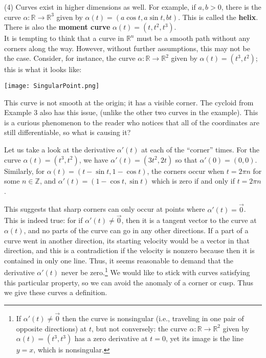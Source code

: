 \documentclass[leqno]{book}
\begin{document}
(4) Curves exist in higher dimensions as well.  For example, if $a,b>0$, there is the curve $\alpha:\mathbb R\to\mathbb R^3$ given by $\alpha(t)=(a\cos t,a\sin t,bt)$.  This is called the \textbf{helix}.  There is also the \textbf{moment curve} $\alpha(t)=(t,t^2,t^3)$.\\

\noindent It is tempting to think that a curve in $\mathbb R^n$ must be a smooth path without any corners along the way.  However, without further assumptions, this may not be the case.  Consider, for instance, the curve $\alpha:\mathbb R\to\mathbb R^2$ given by $\alpha(t)=(t^3,t^2)$; this is what it looks like:
\begin{center}
\texttt{[image: SingularPoint.png]}
\end{center}
This curve is not smooth at the origin; it has a visible corner.  The cycloid from Example 3 also has this issue, (unlike the other two curves in the example).  This is a curious phenomenon to the reader who notices that all of the coordinates are still differentiable, so what is causing it?

Let us take a look at the derivative $\alpha'(t)$ at each of the ``corner'' times.  For the curve $\alpha(t)=(t^3,t^2)$, we have $\alpha'(t)=(3t^2,2t)$ so that $\alpha'(0)=(0,0)$.  Similarly, for $\alpha(t)=(t-\sin t,1-\cos t)$, the corners occur when $t=2\pi n$ for some $n\in\mathbb Z$, and $\alpha'(t)=(1-\cos t,\sin t)$ which is zero if and only if $t=2\pi n$.

This suggests that sharp corners can only occur at points where $\alpha'(t)=\vec 0$.  This is indeed true: for if $\alpha'(t)\ne\vec 0$, then it is a tangent vector to the curve at $\alpha(t)$, and no parts of the curve can go in any other directions.  If a part of a curve went in another direction, its starting velocity would be a vector in that direction, and this is a contradiction if the velocity is nonzero because then it is contained in only one line.  Thus, it seems reasonable to demand that the derivative $\alpha'(t)$ never be zero.\footnote{If $\alpha'(t)\ne\vec 0$ then the curve is nonsingular (i.e., traveling in one pair of opposite directions) at $t$, but not conversely: the curve $\alpha:\mathbb R\to\mathbb R^2$ given by $\alpha(t)=(t^3,t^3)$ has a zero derivative at $t=0$, yet its image is the line $y=x$, which is nonsingular.}  We would like to stick with curves satisfying this particular property, so we can avoid the anomaly of a corner or cusp.  Thus we give these curves a definition.\\
\end{document}
